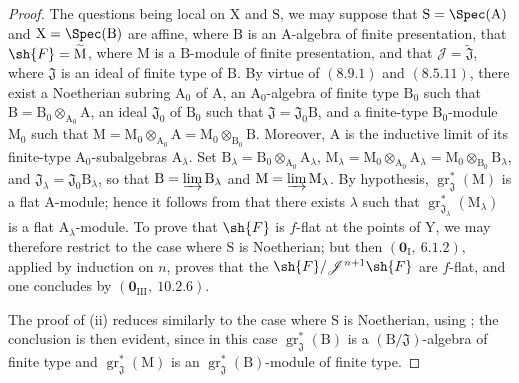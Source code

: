 \begin{proof}
The questions being local on $\mathrm{X}$ and $\mathrm{S}$, we may suppose that
$\mathrm{S}=\Spec(\mathrm{A})$ and $\mathrm{X}=\Spec(\mathrm{B})$ are affine,
where $\mathrm{B}$ is an $\mathrm{A}$-algebra of finite presentation, that
$\sh{F}=\widetilde{\mathrm{M}}$, where $\mathrm{M}$ is a
$\mathrm{B}$-module of finite presentation, and that
$\mathscr{J}=\widetilde{\mathfrak{J}}$, where $\mathfrak{J}$ is an ideal
of finite type of $\mathrm{B}$. By virtue of $(8.9.1)$ and $(8.5.11)$,
there exist a Noetherian subring $\mathrm{A}_0$ of $\mathrm{A}$, an
$\mathrm{A}_0$-algebra of finite type $\mathrm{B}_0$ such that
$\mathrm{B}=\mathrm{B}_0\otimes_{\mathrm{A}_0}\mathrm{A}$, an ideal
$\mathfrak{J}_0$ of $\mathrm{B}_0$ such that
$\mathfrak{J}=\mathfrak{J}_0\mathrm{B}$, and a finite-type
$\mathrm{B}_0$-module $\mathrm{M}_0$ such that
$\mathrm{M}=\mathrm{M}_0\otimes_{\mathrm{A}_0}\mathrm{A}
=\mathrm{M}_0\otimes_{\mathrm{B}_0}\mathrm{B}$. Moreover,
$\mathrm{A}$ is the inductive limit of its finite-type
$\mathrm{A}_0$-subalgebras $\mathrm{A}_\lambda$. Set
$\mathrm{B}_\lambda=\mathrm{B}_0\otimes_{\mathrm{A}_0}\mathrm{A}_\lambda$,
$\mathrm{M}_\lambda=\mathrm{M}_0\otimes_{\mathrm{A}_0}\mathrm{A}_\lambda
=\mathrm{M}_0\otimes_{\mathrm{B}_0}\mathrm{B}_\lambda$, and
$\mathfrak{J}_\lambda=\mathfrak{J}_0\mathrm{B}_\lambda$, so that
$\mathrm{B}=\varinjlim\mathrm{B}_\lambda$ and
$\mathrm{M}=\varinjlim\mathrm{M}_\lambda$. By hypothesis,
$\operatorname{gr}^*_\mathfrak{J}(\mathrm{M})$ is a flat
$\mathrm{A}$-module; hence it follows from  that there
exists $\lambda$ such that
$\operatorname{gr}^*_{\mathfrak{J}_\lambda}(\mathrm{M}_\lambda)$ is a
flat $\mathrm{A}_\lambda$-module. To prove that $\sh{F}$ is $f$-flat at
the points of $\mathrm{Y}$, we may therefore restrict to the case where
$\mathrm{S}$ is Noetherian; but then $(\mathbf{0}_\mathrm{I},~6.1.2)$,
applied by induction on $n$, proves that the
$\sh{F}/\mathscr{J}^{n+1}\sh{F}$ are $f$-flat, and one concludes by
$(\mathbf{0}_{\mathrm{III}},~10.2.6)$.

The proof of (ii) reduces similarly to the case where $\mathrm{S}$ is Noetherian, using ; the conclusion is then evident, since in this case $\operatorname{gr}^*_\mathfrak{J}(\mathrm{B})$ is a $(\mathrm{B}/\mathfrak{J})$-algebra of finite type and $\operatorname{gr}^*_\mathfrak{J}(\mathrm{M})$ is an $\operatorname{gr}^*_\mathfrak{J}(\mathrm{B})$-module of finite type.


\end{proof}
